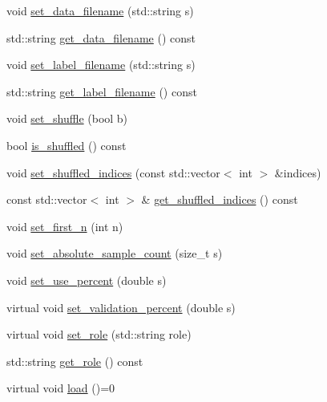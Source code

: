 \begin{DoxyCompactItemize}
\item 
void \hyperlink{classlbann_1_1generic__data__reader_a74b7ef4fe0dc7d3a96868ca3b5fbf897}{set\+\_\+data\+\_\+filename} (std\+::string s)
\item 
std\+::string \hyperlink{classlbann_1_1generic__data__reader_a56664e1b43f3fe923cf6d652f14b40a9}{get\+\_\+data\+\_\+filename} () const
\item 
void \hyperlink{classlbann_1_1generic__data__reader_af45f301cc9adc2f8184b81d8d2600b8f}{set\+\_\+label\+\_\+filename} (std\+::string s)
\item 
std\+::string \hyperlink{classlbann_1_1generic__data__reader_af0f82d719fcd6e0668414836f2673d5c}{get\+\_\+label\+\_\+filename} () const
\item 
void \hyperlink{classlbann_1_1generic__data__reader_a7b0fc770678e22c44a824e88444da765}{set\+\_\+shuffle} (bool b)
\item 
bool \hyperlink{classlbann_1_1generic__data__reader_a7d67ce4d10e5cdcdff47f5ecdcee6eb0}{is\+\_\+shuffled} () const
\item 
void \hyperlink{classlbann_1_1generic__data__reader_ad07a5edb92c3927ef809fca0d95665bc}{set\+\_\+shuffled\+\_\+indices} (const std\+::vector$<$ int $>$ \&indices)
\item 
const std\+::vector$<$ int $>$ \& \hyperlink{classlbann_1_1generic__data__reader_a38eedaa9c8680e885a3ec05009f5f492}{get\+\_\+shuffled\+\_\+indices} () const
\item 
void \hyperlink{classlbann_1_1generic__data__reader_aca4e6c31df0a1579079274bc48fbbf26}{set\+\_\+first\+\_\+n} (int n)
\item 
void \hyperlink{classlbann_1_1generic__data__reader_aa2d83c4ffc58534e0c193b6b9f9fb925}{set\+\_\+absolute\+\_\+sample\+\_\+count} (size\+\_\+t s)
\item 
void \hyperlink{classlbann_1_1generic__data__reader_ae6929a8bd2e59da72a8c2e537f0b2b37}{set\+\_\+use\+\_\+percent} (double s)
\item 
virtual void \hyperlink{classlbann_1_1generic__data__reader_a18b67bfa426eb4d2c8195d115c4df49f}{set\+\_\+validation\+\_\+percent} (double s)
\item 
virtual void \hyperlink{classlbann_1_1generic__data__reader_adeb9413be971a0c1454fdeb46fea0716}{set\+\_\+role} (std\+::string role)
\item 
std\+::string \hyperlink{classlbann_1_1generic__data__reader_a92982e1b399f37e2ead5aa440883cba5}{get\+\_\+role} () const
\item 
virtual void \hyperlink{classlbann_1_1generic__data__reader_afeb47703d988a230a59859cbfc178215}{load} ()=0

\end{DoxyCompactItemize}
